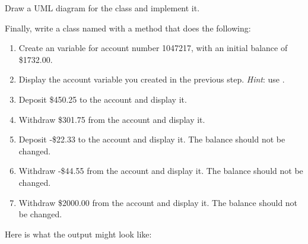 \begin{exercise}
Draw a UML diagram for the class and implement it.

Finally, write a class named  with a  method that does the following:

\begin{enumerate}
\item Create an  variable for account number 1047217, with an initial balance of \$1732.00. 

\item Display the account variable you created in the previous step. {\em Hint}: use .

\item Deposit \$450.25 to the account and display it.

\item Withdraw \$301.75 from the account and display it.

\item Deposit -\$22.33 to the account and display it. The balance should not be changed.

\item Withdraw -\$44.55 from the account and display it. The balance should not be changed.

\item Withdraw \$2000.00 from the account and display it. The balance should not be changed.
\end{enumerate}

Here is what the output might look like:

\end{exercise}

